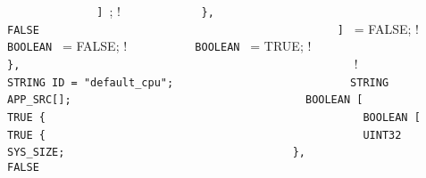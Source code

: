 {{{\lstinline!              ] !;              ! \newline
\lstinline!            },                                       ! \newline
\lstinline!            FALSE                                    ! \newline
\lstinline!          ] ! = FALSE;        ! \newline
\lstinline!                                                     ! \newline
\lstinline!          BOOLEAN ! = FALSE;         ! \newline
\lstinline!          BOOLEAN ! = TRUE;  ! \newline
\lstinline!	                                                ! \newline
\lstinline!        },                                           ! \newline
\lstinline!        !\quad \quad{} {              ! \newline
\lstinline!          STRING ID = "default_cpu";                 ! \newline
\lstinline!          STRING APP_SRC[];                          ! \newline
\newline
\lstinline!          BOOLEAN [                                  ! \newline
\lstinline!            TRUE {                                   ! \newline
\lstinline!              BOOLEAN [                              ! \newline
\lstinline!                TRUE {                               ! \newline
\lstinline!                  UINT32 SYS_SIZE;                   ! \newline
\lstinline!                },                                   ! \newline
\lstinline!                FALSE                                ! \newline
}}}}
